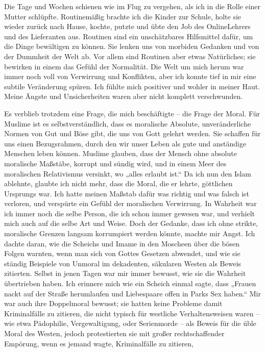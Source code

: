 \documentclass[12pt]{memoir}
\begin{document}
Die Tage und Wochen schienen wie im Flug zu vergehen,
als ich in die Rolle einer Mutter schlüpfte.
Routinemäßig brachte ich die Kinder zur Schule,
holte sie wieder zurück nach Hause, kochte,
putzte und übte den Job des Online\–Lehrers und des Lieferanten aus.
Routinen sind ein unschätzbares Hilfsmittel dafür,
um die Dinge bewältigen zu können.
Sie lenken uns von morbiden Gedanken und von der Dummheit der Welt ab.
Vor allem sind Routinen aber etwas Natürliches;
sie bewirken in einem das Gefühl der Normalität.
Die Welt um mich herum war immer noch voll von Verwirrung und Konflikten,
aber ich konnte tief in mir eine subtile Veränderung spüren.
Ich fühlte mich positiver und wohler in meiner Haut.
Meine Ängste und Unsicherheiten waren aber nicht komplett verschwunden.

Es verblieb trotzdem eine Frage, die mich beschäftigte – die Frage der Moral.
Für Muslime ist es selbstverständlich, dass es moralische Absolute,
unveränderliche Normen von Gut und Böse gibt,
die uns von Gott gelehrt werden.
Sie schaffen für uns einen Bezugsrahmen,
durch den wir unser Leben als gute und anständige Menschen leben können.
Muslime glauben, dass der Mensch ohne absolute moralische Maßstäbe,
korrupt und sündig wird, und in einem Meer
des moralischen Relativismus versinkt, wo „alles erlaubt ist.“
Da ich nun den Islam ablehnte, glaubte ich nicht mehr,
dass die Moral, die er lehrte, göttlichen Ursprungs war.
Ich hatte meinen Maßstab dafür was richtig und was falsch ist verloren,
und verspürte ein Gefühl der moralischen Verwirrung.
In Wahrheit war ich immer noch die selbe Person,
die ich schon immer gewesen war,
und verhielt mich auch auf die selbe Art und Weise.
Doch der Gedanke, dass ich ohne strikte, moralische Grenzen
langsam korrumpiert werden könnte, machte mir Angst.
Ich dachte daran, wie die Scheichs und Imame in den Moscheen
über die bösen Folgen warnten, wenn man sich von Gottes Gesetzen abwendet,
und wie sie ständig Beispiele von Unmoral im dekadenten,
säkularen Westen als Beweis zitierten.
Selbst in jenen Tagen war mir immer bewusst,
wie sie die Wahrheit übertrieben haben.
Ich erinnere mich wie ein Scheich einmal sagte,
dass „Frauen nackt auf der Straße herumlaufen
und Liebespaare offen in Parks Sex haben.“
Mir war auch ihre Doppelmoral bewusst;
sie hatten keine Probleme damit Kriminalfälle zu zitieren,
die nicht typisch für westliche Verhaltensweisen waren –
wie etwa Pädophilie, Vergewaltigung, oder Serienmorde –
als Beweis für die üble Moral des Westen,
jedoch protestierten sie mit großer rechtschaffender Empörung,
wenn es jemand wagte, Kriminalfälle zu zitieren,
\end{document}
